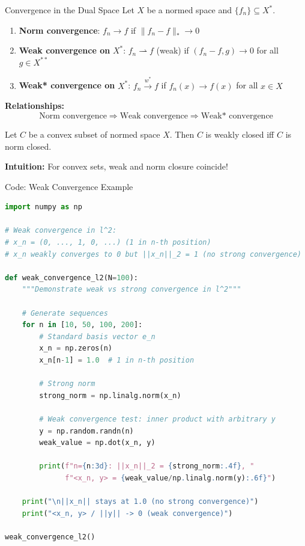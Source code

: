 \documentclass[aspectratio=169,10pt]{beamer}
\begin{document}
\begin{frame}{Convergence in the Dual Space}
  Let $X$ be a normed space and $\{f_n\} \subseteq X^*$.

  \vspace{0.2cm}
  \begin{enumerate}
    \item \textbf{Norm convergence}: $f_n \to f$ if $\|f_n - f\|_* \to 0$
    \vspace{0.1cm}

    \item \textbf{Weak convergence on } $X^*$: $f_n \rightharpoonup f$ (weak) if $(f_n - f, g) \to 0$ for all $g \in X^{**}$
    \vspace{0.1cm}

    \item \textbf{Weak* convergence on } $X^*$: $f_n \xrightarrow{w^*} f$ if $f_n(x) \to f(x)$ for all $x \in X$
  \end{enumerate}

  \vspace{0.3cm}
  \textbf{Relationships:}
  $$\text{Norm convergence} \Rightarrow \text{Weak convergence} \Rightarrow \text{Weak* convergence}$$

  \vspace{0.3cm}
  \begin{proposition}[Proposition 1.12]
    Let $C$ be a convex subset of normed space $X$. Then $C$ is weakly closed iff $C$ is norm closed.
  \end{proposition}

  \vspace{0.3cm}
  \textbf{Intuition:} For convex sets, weak and norm closure coincide!
\end{frame}

\begin{frame}[fragile]{Code: Weak Convergence Example}
  \begin{lstlisting}[language=Python]
import numpy as np

# Weak convergence in l^2:
# x_n = (0, ..., 1, 0, ...) (1 in n-th position)
# x_n weakly converges to 0 but ||x_n||_2 = 1 (no strong convergence)

def weak_convergence_l2(N=100):
    """Demonstrate weak vs strong convergence in l^2"""

    # Generate sequences
    for n in [10, 50, 100, 200]:
        # Standard basis vector e_n
        x_n = np.zeros(n)
        x_n[n-1] = 1.0  # 1 in n-th position

        # Strong norm
        strong_norm = np.linalg.norm(x_n)

        # Weak convergence test: inner product with arbitrary y
        y = np.random.randn(n)
        weak_value = np.dot(x_n, y)

        print(f"n={n:3d}: ||x_n||_2 = {strong_norm:.4f}, "
              f"<x_n, y> = {weak_value/np.linalg.norm(y):.6f}")

    print("\n||x_n|| stays at 1.0 (no strong convergence)")
    print("<x_n, y> / ||y|| -> 0 (weak convergence)")

weak_convergence_l2()
  \end{lstlisting}
\end{frame}
\end{document}

